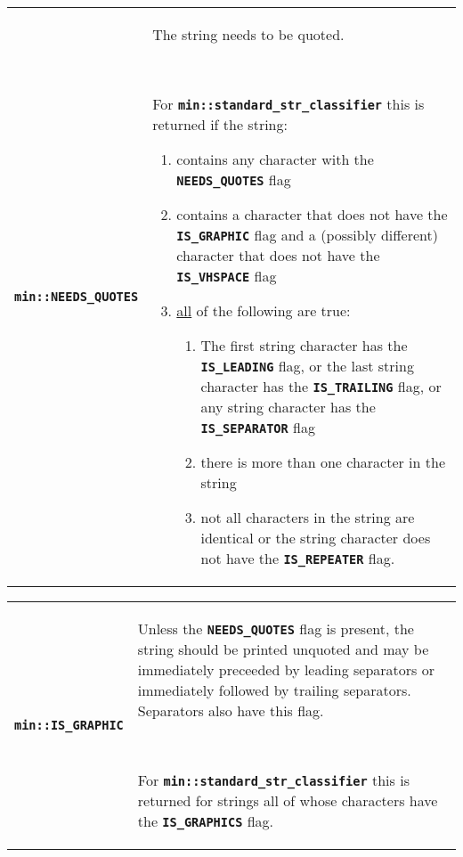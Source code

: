 \documentclass[12pt]{article}
\newcommand{\TT}[1]{{\tt \bfseries #1}}
\newcommand{\EOL}{\penalty \exhyphenpenalty}
\newenvironment{indpar}[1][0.3in]%
	{\begin{list}{}%
		     {\setlength{\itemsep}{0in}%
		      \setlength{\topsep}{0in}%
		      \setlength{\parsep}{1ex}%
		      \setlength{\labelwidth}{#1}%
		      \setlength{\leftmargin}{#1}%
		      \addtolength{\leftmargin}{\labelsep}}%
	 \item}%
	{\end{list}}
\begin{document}
\begin{indpar}\begin{tabular}{p{1.5in}@{~~~}p{4.0in}}
\TT{min::NEEDS\_QUOTES}	& The string needs to be quoted.

			  ~~

			  For \TT{min::\EOL standard\_\EOL str\_\EOL classifier}
			  this is returned if the string:
			  \begin{enumerate}
			  \item
			  contains any character with the
			  \TT{NEEDS\_\EOL QUOTES} flag
			  \item
			  contains a character that does not
			  have the \TT{IS\_\EOL GRAPHIC} flag and a (possibly
			  different) character that does not have the
			  \TT{IS\_\EOL VHSPACE} flag
			  \item
			  \underline{all} of the following are true:
			  \begin{enumerate}
			  \item The first string character has the
			  \TT{IS\_\EOL LEADING} flag,
			  or the last string character has the
			  \TT{IS\_\EOL TRAILING} flag,
			  or any string character has the
			  \TT{IS\_\EOL SEPARATOR} flag
			  \item there is more than one character in the
			  string
			  \item not all characters in the string are identical
			  or the string character does not have the
			  \TT{IS\_\EOL REPEATER} flag.
			  \end{enumerate}
			  \end{enumerate}
\label{NEEDS_QUOTES_CLASSIFIER} \\
\end{tabular}\end{indpar}

\begin{indpar}\begin{tabular}{p{1.5in}@{~~~}p{4.0in}}
\TT{min::IS\_GRAPHIC}	& Unless the \TT{NEEDS\_QUOTES} flag is present,
                          the string should be printed unquoted and may be
                          immediately preceeded by leading separators or
			  immediately followed
			  by trailing separators.  Separators also have
			  this flag.

			  ~~

			  For \TT{min::\EOL standard\_\EOL str\_\EOL classifier}
			  this is returned for strings all of whose characters
			  have the \TT{IS\_\EOL GRAPHICS} flag.
\label{IS_GRAPHIC_CLASSIFIER} \\
\end{tabular}\end{indpar}
\end{document}
